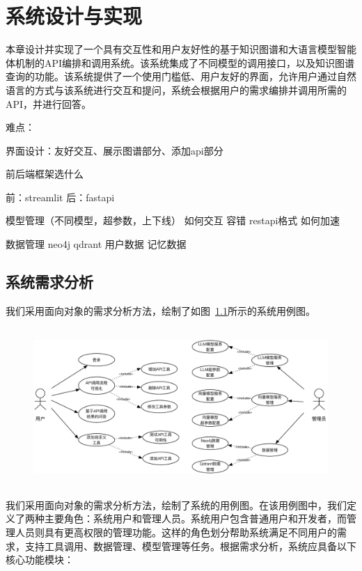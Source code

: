 
\chapter{系统设计与实现}

本章设计并实现了一个具有交互性和用户友好性的基于知识图谱和大语言模型智能体机制的API编排和调用系统。该系统集成了不同模型的调用接口，以及知识图谱查询的功能。该系统提供了一个使用门槛低、用户友好的界面，允许用户通过自然语言的方式与该系统进行交互和提问，系统会根据用户的需求编排并调用所需的API，并进行回答。

难点：

界面设计：友好交互、展示图谱部分、添加api部分

前后端框架选什么

前：streamlit 后：fastapi


模型管理（不同模型，超参数，上下线） 如何交互 容错 restapi格式 如何加速

数据管理 neo4j qdrant 用户数据 记忆数据

\section{系统需求分析}

\indent 我们采用面向对象的需求分析方法，绘制了如图~\ref{fig:usecase}所示的系统用例图。

\begin{figure}[!htp]
  \vspace{1em}
  \centering
  \setlength{\abovecaptionskip}{10pt} %
  \includegraphics[height=6cm]{../assets/ch5-用例图.pdf}
  \label{fig:usecase}
\end{figure}

我们采用面向对象的需求分析方法，绘制了系统的用例图。在该用例图中，我们定义了两种主要角色：系统用户和管理人员。系统用户包含普通用户和开发者，而管理人员则具有更高权限的管理功能。这样的角色划分帮助系统满足不同用户的需求，支持工具调用、数据管理、模型管理等任务。根据需求分析，系统应具备以下核心功能模块：

